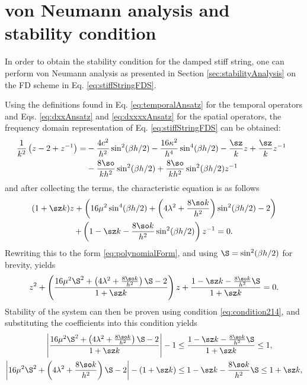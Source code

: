 {\section{von Neumann analysis and stability condition}\label{sec:stiffStringStability}
In order to obtain the stability condition for the damped stiff string, one can perform von Neumann analysis as presented in Section \ref{sec:stabilityAnalysis} on the FD scheme in Eq. \eqref{eq:stiffStringFDS}.

Using the definitions found in Eq. \eqref{eq:temporalAnsatz} for the temporal operators and Eqs. \eqref{eq:dxxAnsatz} and \eqref{eq:dxxxxAnsatz} for the spatial operators, the frequency domain representation of Eq. \eqref{eq:stiffStringFDS} can be obtained:
\begin{align*}
    \!\!\!\!\frac{1}{k^2}\left(z - 2 + z^{-1}\right) =&-\frac{4c^2}{h^2}\sin^2(\beta h/2) - \frac{16\kappa^2}{h^4}\sin^4(\beta h/2) - \frac{\sz}{k}z + \frac{\sz}{k}z^{-1}\\
    & - \frac{8 \so}{kh^2}\sin^2(\beta h/2) + \frac{8 \so}{kh^2} \sin^2(\beta h/2)z^{-1}
\end{align*}
and after collecting the terms, the characteristic equation is as follows
\begin{gather}
    (1+\sz k)z + \left(16\mu^2\sin^4(\beta h/2)+\left(4\lambda^2+\frac{8\so k}{h^2}\right)\sin^2(\beta h/2) - 2\right)\nonumber\\
    +\left(1-\sz k-\frac{8\so k}{h^2}\sin^2(\beta h/2)\right)z^{-1}=0.\label{eq:charDampedString}
\end{gather}
Rewriting this to the form \eqref{eq:polynomialForm}, and using $\S = \sin^2(\beta h /2)$ for brevity, yields
\begin{equation*}
    z^2 + \left(\frac{16\mu^2\S^2+\left(4\lambda^2+\frac{8\so k}{h^2}\right)\S - 2}{1 + \sz k}\right)z+\frac{1-\sz k-\frac{8\so k}{h^2}\S}{1 + \sz k}=0.
\end{equation*}
Stability of the system can then be proven using condition \eqref{eq:condition214}, and substituting the coefficients into this condition yields
\begin{equation}\nonumber
    \begin{aligned}
        \left|\frac{16\mu^2\S^2+\left(4\lambda^2+\frac{8\so k}{h^2}\right)\S - 2}{1+\sz k}\right|-1 &\leq \frac{1-\sz k-\frac{8\so k}{h^2}\S}{1+\sz k}\leq 1,\\
        \left|16\mu^2\S^2+\left(4\lambda^2+\frac{8\so k}{h^2}\right)\S - 2\right|-(1+\sz k) &\leq 1-\sz k-\frac{8\so k}{h^2}\S\leq 1+\sz k,\\

\end{aligned}
\end{equation}}
